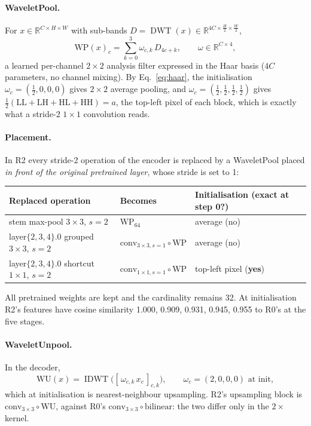 \documentclass[11pt]{article}
\newcommand{\R}{\mathbb{R}}
\newcommand{\DWT}{\operatorname{DWT}}
\newcommand{\IDWT}{\operatorname{IDWT}}
\begin{document}
\paragraph{WaveletPool.} For $x\in\R^{C\times H\times W}$ with sub-bands
$D = \DWT(x)\in\R^{4C\times\frac H2\times\frac W2}$,
\begin{equation}
  \mathrm{WP}(x)_c = \sum_{k=0}^{3} \omega_{c,k}\, D_{4c+k},\qquad \omega\in\R^{C\times4},
\end{equation}
a learned per-channel $2\times2$ analysis filter expressed in the Haar basis ($4C$ parameters, no
channel mixing). By Eq.~\eqref{eq:haar}, the initialisation $\omega_{c} = (\tfrac12,0,0,0)$ gives
$2\times2$ average pooling, and $\omega_c = (\tfrac12,\tfrac12,\tfrac12,\tfrac12)$ gives
$\tfrac12(\mathrm{LL}+\mathrm{LH}+\mathrm{HL}+\mathrm{HH}) = a$, the top-left pixel of each block,
which is exactly what a stride-2 $1\times1$ convolution reads.

\paragraph{Placement.} In R2 every stride-2 operation of the encoder is replaced by a WaveletPool
placed \emph{in front of the original pretrained layer}, whose stride is set to 1:
\begin{center}
\begin{tabular}{@{}lll@{}}
\toprule
Replaced operation & Becomes & Initialisation (exact at step 0?) \\
\midrule
stem max-pool $3{\times}3$, $s=2$ & $\mathrm{WP}_{64}$ & average (no) \\
layer$\{2,3,4\}$.0 grouped $3{\times}3$, $s=2$ & $\mathrm{conv}_{3\times3,s=1}\circ\mathrm{WP}$ & average (no) \\
layer$\{2,3,4\}$.0 shortcut $1{\times}1$, $s=2$ & $\mathrm{conv}_{1\times1,s=1}\circ\mathrm{WP}$ & top-left pixel (\textbf{yes}) \\
\bottomrule
\end{tabular}
\end{center}
All pretrained weights are kept and the cardinality remains 32. At initialisation R2's features
have cosine similarity 1.000, 0.909, 0.931, 0.945, 0.955 to R0's at the five stages.

\paragraph{WaveletUnpool.} In the decoder,
\begin{equation}
  \mathrm{WU}(x) = \IDWT\big([\,\omega_{c,k}\,x_c\,]_{c,k}\big),\qquad \omega_c = (2,0,0,0)\text{ at init},
\end{equation}
which at initialisation is nearest-neighbour upsampling. R2's upsampling block is
$\mathrm{conv}_{3\times3}\circ\mathrm{WU}$, against R0's $\mathrm{conv}_{3\times3}\circ\mathrm{bilinear}$:
the two differ only in the $2\times$ kernel.
\end{document}
